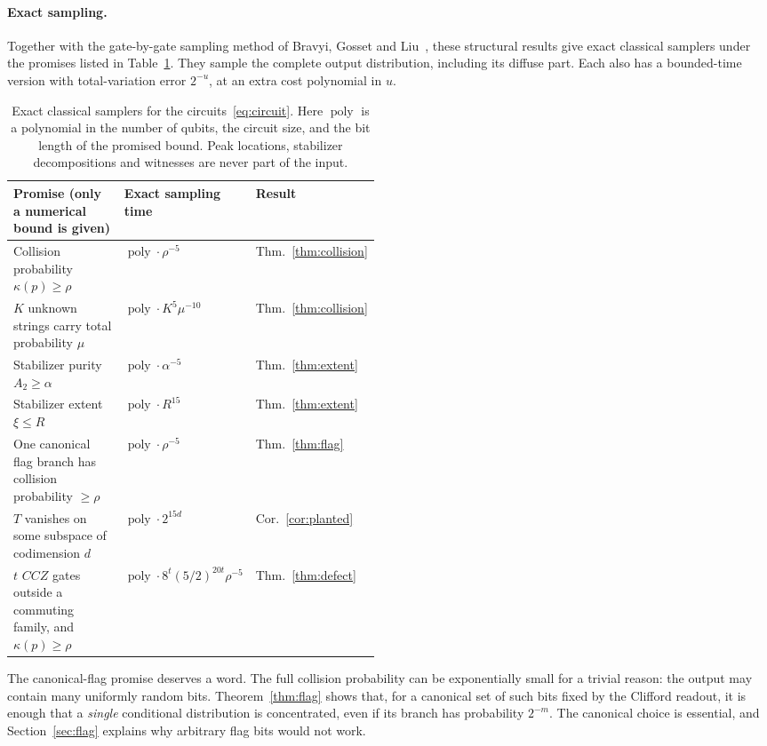 \documentclass[a4paper,onecolumn,11pt,unpublished]{quantumarticle}
\theoremstyle{plain}
\theoremstyle{remark}
\DeclareMathOperator{\poly}{poly}
\begin{document}
\paragraph{Exact sampling.}
Together with the gate-by-gate sampling method of Bravyi, Gosset and Liu~\cite{BGL22}, these structural results give exact classical samplers under the promises listed in Table~\ref{tab:results}. They sample the complete output distribution, including its diffuse part. Each also has a bounded-time version with total-variation error $2^{-u}$, at an extra cost polynomial in $u$.

\begin{table}[t]
\centering
\renewcommand{\arraystretch}{1.3}
\begin{tabular}{@{}>{\raggedright\arraybackslash}p{0.48\linewidth}ll@{}}
\toprule
Promise (only a numerical bound is given) & Exact sampling time & Result\\
\midrule
Collision probability $\kappa(p)\ge\rho$ & $\poly\cdot\rho^{-5}$ & Thm.~\ref{thm:collision}\\
$K$ unknown strings carry total probability $\mu$ & $\poly\cdot K^5\mu^{-10}$ & Thm.~\ref{thm:collision}\\
Stabilizer purity $A_2\ge\alpha$ & $\poly\cdot\alpha^{-5}$ & Thm.~\ref{thm:extent}\\
Stabilizer extent $\xi\le R$ & $\poly\cdot R^{15}$ & Thm.~\ref{thm:extent}\\
One canonical flag branch has collision probability $\ge\rho$ & $\poly\cdot\rho^{-5}$ & Thm.~\ref{thm:flag}\\
$T$ vanishes on some subspace of codimension $d$ & $\poly\cdot 2^{15d}$ & Cor.~\ref{cor:planted}\\
$t$ $CCZ$ gates outside a commuting family, and $\kappa(p)\ge\rho$ & $\poly\cdot 8^t(5/2)^{20t}\rho^{-5}$ & Thm.~\ref{thm:defect}\\
\bottomrule
\end{tabular}
\caption{Exact classical samplers for the circuits~\eqref{eq:circuit}. Here $\poly$ is a polynomial in the number of qubits, the circuit size, and the bit length of the promised bound. Peak locations, stabilizer decompositions and witnesses are never part of the input.}
\label{tab:results}
\end{table}

The canonical-flag promise deserves a word. The full collision probability can be exponentially small for a trivial reason: the output may contain many uniformly random bits. Theorem~\ref{thm:flag} shows that, for a canonical set of such bits fixed by the Clifford readout, it is enough that a \emph{single} conditional distribution is concentrated, even if its branch has probability $2^{-m}$. The canonical choice is essential, and Section~\ref{sec:flag} explains why arbitrary flag bits would not work.
\end{document}

